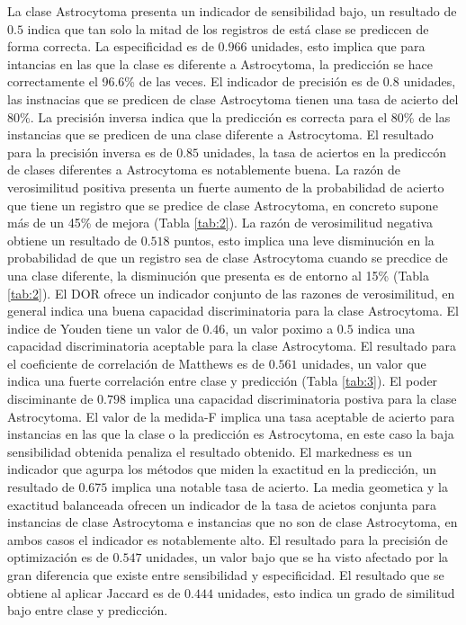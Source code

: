 La clase Astrocytoma presenta un indicador de sensibilidad bajo, un resultado de $0.5$ indica que tan solo la mitad de los registros de está clase se prediccen de forma correcta. La especificidad es de $0.966$ unidades, esto implica que para intancias en las que la clase es diferente a Astrocytoma, la predicción se hace correctamente el 96.6\% de las veces. El indicador de precisión es de $0.8$ unidades, las instnacias que se predicen de clase Astrocytoma tienen una tasa de acierto del $80$\%. La precisión inversa indica que la predicción es correcta para el 80\% de las instancias que se predicen de una clase diferente a Astrocytoma. El resultado para la precisión inversa es de $0.85$ unidades, la tasa de aciertos en la prediccón de clases diferentes a Astrocytoma es notablemente buena. La razón de verosimilitud positiva presenta un fuerte aumento de la probabilidad de acierto que tiene un registro que se predice de clase Astrocytoma, en concreto supone más de un 45\% de mejora (Tabla \ref{tab:2}). La razón de verosimilitud negativa obtiene un resultado de $0.518$ puntos, esto implica una leve disminución en la probabilidad de que un registro sea de clase Astrocytoma cuando se precdice de una clase diferente, la disminución que presenta es de entorno al 15\% (Tabla \ref{tab:2}). El DOR ofrece un indicador conjunto de las razones de verosimilitud, en general indica una buena capacidad discriminatoria para la clase Astrocytoma. El indice de Youden tiene un valor de $0.46$, un valor poximo a $0.5$ indica una capacidad discriminatoria aceptable para la clase Astrocytoma. El resultado para el coeficiente de correlación de Matthews es de $0.561$ unidades, un valor que indica una fuerte correlación entre clase y predicción (Tabla \ref{tab:3}). El poder disciminante de $0.798$ implica una capacidad discriminatoria postiva para la clase Astrocytoma. El valor de la medida-F implica una tasa aceptable de acierto para instancias en las que la clase o la predicción es Astrocytoma, en este caso la baja sensibilidad obtenida penaliza el resultado obtenido. El markedness es un indicador que agurpa los métodos que miden la exactitud en la predicción, un resultado de $0.675$ implica una notable tasa de acierto. La media geometica y la exactitud balanceada ofrecen un indicador de la tasa de acietos conjunta para instancias de clase Astrocytoma e instancias que no son de clase Astrocytoma, en ambos casos el indicador es notablemente alto. El resultado para la precisión de optimización es de $0.547$ unidades, un valor bajo que se ha visto afectado por la gran diferencia que existe entre sensibilidad y especificidad. El resultado que se obtiene al aplicar Jaccard es de $0.444$ unidades, esto indica un grado de similitud bajo entre clase y predicción.

